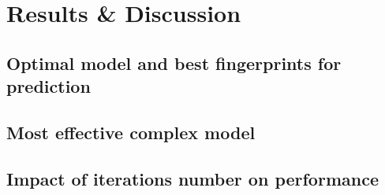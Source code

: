 \chapter{Results \& Discussion}
\section{Optimal model and best fingerprints for prediction}
\section{Most effective complex model}
\section{Impact of iterations number on performance}